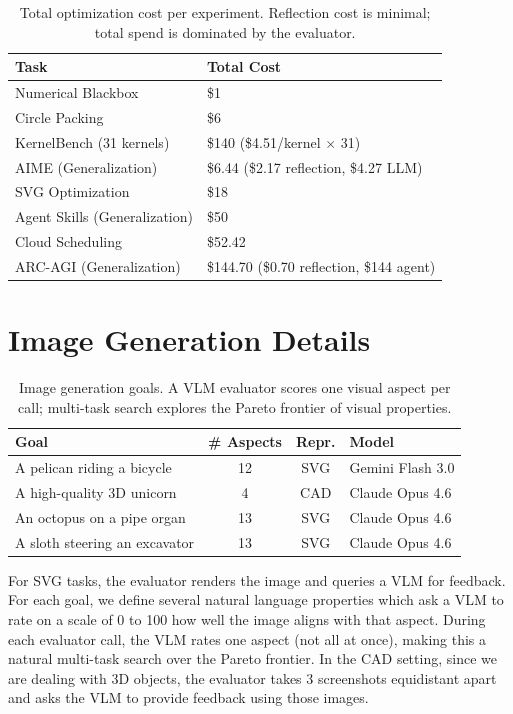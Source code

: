 \documentclass[sigconf]{acmart}
\begin{document}
\begin{table}[h]
\caption{Total optimization cost per experiment. Reflection cost is minimal; total spend is dominated by the evaluator.}
\label{tab:optimization-cost}
\small
\begin{tabular}{@{}ll@{}}
\toprule
\textbf{Task} & \textbf{Total Cost} \\
\midrule
Numerical Blackbox & \$1 \\
Circle Packing & \$6 \\
KernelBench (31 kernels) & \$140 (\$4.51/kernel $\times$ 31) \\
AIME (Generalization) & \$6.44 (\$2.17 reflection, \$4.27 LLM) \\
SVG Optimization & \$18 \\
Agent Skills (Generalization) & \$50 \\
Cloud Scheduling & \$52.42 \\
ARC-AGI (Generalization) & \$144.70 (\$0.70 reflection, \$144 agent) \\
\bottomrule
\end{tabular}
\end{table}

\section{Image Generation Details}\label{app:imggen-details}

\begin{table}[h]
    \centering
    \small
    \begin{tabular}{@{}p{3.5cm}ccl@{}}
    \toprule
    \textbf{Goal} & \textbf{\# Aspects} & \textbf{Repr.} & \textbf{Model} \\
    \midrule
    A pelican riding a bicycle & 12 & SVG & Gemini Flash 3.0 \\
    A high-quality 3D unicorn & 4 & CAD & Claude Opus 4.6 \\
    An octopus on a pipe organ & 13 & SVG & Claude Opus 4.6 \\
    A sloth steering an excavator & 13 & SVG & Claude Opus 4.6 \\
    \bottomrule
    \end{tabular}
    \caption{Image generation goals. A VLM evaluator scores one visual aspect per call; multi-task search explores the Pareto frontier of visual properties.}
    \label{tab:optimization_examples}
\end{table}

For SVG tasks, the evaluator renders the image and queries a VLM for feedback. For each goal, we define several natural language properties which ask a VLM to rate on a scale of 0 to 100 how well the image aligns with that aspect. During each evaluator call, the VLM rates one aspect (not all at once), making this a natural multi-task search over the Pareto frontier. In the CAD setting, since we are dealing with 3D objects, the evaluator takes 3 screenshots equidistant apart and asks the VLM to provide feedback using those images.
\end{document}
